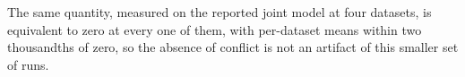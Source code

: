 The same quantity, measured on the reported joint model at four datasets, is equivalent to zero at
every one of them, with per-dataset means within two thousandths of zero, so the absence of
conflict is not an artifact of this smaller set of runs.

